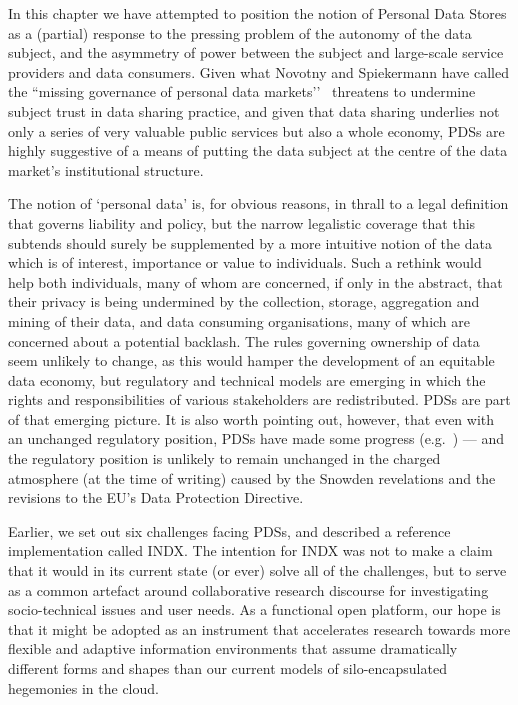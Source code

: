 \documentclass[graybox]{svmult}
\begin{document}
In this chapter we have attempted to position the notion of Personal Data Stores as a (partial) response to the pressing problem of the autonomy of the data subject, and the asymmetry of power between the subject and large-scale service providers and data consumers. Given what Novotny and Spiekermann have called the ``missing governance of personal data markets’’~\cite{novotny2013} threatens to undermine subject trust in data sharing practice, and given that data sharing underlies not only a series of very valuable public services but also a whole economy, PDSs are highly suggestive of a means of putting the data subject at the centre of the data market’s institutional structure.

The notion of `personal data’ is, for obvious reasons, in thrall to a legal definition that governs liability and policy, but the narrow legalistic coverage that this subtends should surely be supplemented by a more intuitive notion of the data which is of interest, importance or value to individuals. Such a rethink would help both individuals, many of whom are concerned, if only in the abstract, that their privacy is being undermined by the collection, storage, aggregation and mining of their data, and data consuming organisations, many of which are concerned about a potential backlash. The rules governing ownership of data seem unlikely to change, as this would hamper the development of an equitable data economy, but regulatory and technical models are emerging in which the rights and responsibilities of various stakeholders are redistributed. PDSs are part of that emerging picture. It is also worth pointing out, however, that even with an unchanged regulatory position, PDSs have made some progress (e.g.~\cite{heath2013}) --- and the regulatory position is unlikely to remain unchanged in the charged atmosphere (at the time of writing) caused by the Snowden revelations and the revisions to the EU’s Data Protection Directive.

Earlier, we set out six challenges facing PDSs, and described a reference implementation called INDX.  The intention for INDX was not to make a claim that it would in its current state (or ever) solve all of the challenges, but to serve as a common artefact around collaborative research discourse for investigating socio-technical issues and user needs.  As a functional open platform, our hope is that it might be adopted as an instrument that accelerates research towards more flexible and adaptive information environments that assume dramatically different forms and shapes than our current models of silo-encapsulated hegemonies in the cloud.
\end{document}
